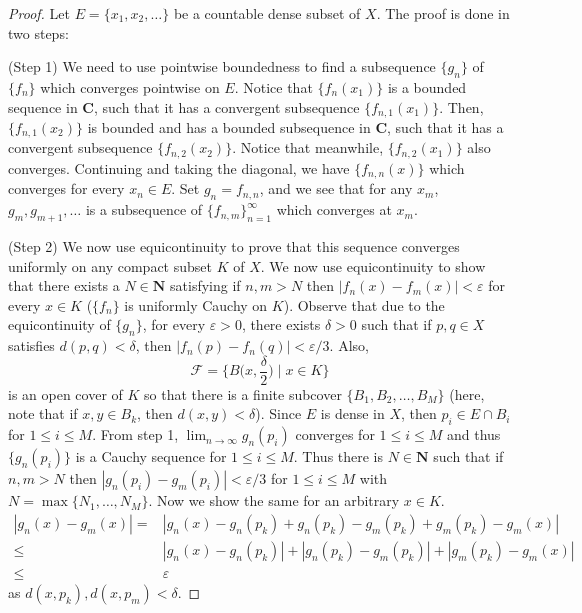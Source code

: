 \begin{proof}
Let $E=\{x_1,x_2,\ldots \}$ be a countable dense subset of $X$. The proof is done in two steps:

\bigskip

(Step 1) We need to use pointwise boundedness to find a subsequence $\{g_{n}\}$ of $\{f_{n}\}$ which converges pointwise on $E$. Notice that $\{f_{n}(x_1)\}$ is a bounded sequence in ${\bm C}$, such that it has a convergent subsequence $\{f_{n,1}(x_1)\}$. Then, $\{f_{n,1}(x_2)\}$ is bounded and has a bounded subsequence in ${\bm C}$, such that it has a convergent subsequence $\{f_{n,2}(x_2)\}$. Notice that meanwhile, $\{f_{n,2}(x_1)\}$ also converges. Continuing and taking the diagonal, we have $\{f_{n,n}(x)\}$ which converges for every $x_{n}\in E$. Set $g_{n}=f_{n,n}$, and we see that for any $x_{m}$, $g_{m},g_{m+1},\ldots $ is a subsequence of $\{f_{n,m}\}^{\infty }_{n=1}$ which converges at $x_{m}$. 

\bigskip

(Step 2) We now use equicontinuity to prove that this sequence converges uniformly on any compact subset $K$ of $X$. We now use equicontinuity to show that there exists a $N\in {\bm N}$ satisfying if $n,m>N$ then $|f_{n}(x)-f_{m}(x)|<\varepsilon $ for every $x\in K$ ($\{f_{n}\}$ is uniformly Cauchy on $K$). Observe that due to the equicontinuity of $\{g_{n}\}$, for every $\varepsilon >0$, there exists $\delta >0$ such that if $p,q\in X$ satisfies $d(p,q)<\delta $, then $|f_{n}(p)-f_{n}(q)|<\varepsilon /3$. Also, 
\[\mathcal{F}=\Big\{B\Big(x,\dfrac{\delta }{2}\Big)\;\Big|\;x\in K\Big\}\]
is an open cover of $K$ so that there is a finite subcover $\{B_1,B_2,\ldots ,B_{M}\}$ (here, note that if $x,y\in B_{k}$, then $d(x,y)<\delta $). Since $E$ is dense in $X$, then $p_{i}\in E\cap B_{i}$ for $1\leq i\leq M$. From step 1, $\lim _{n\rightarrow \infty } g_{n}(p_{i})$ converges for $1\leq i\leq M$ and thus $\{g_{n}(p_{i})\}$ is a Cauchy sequence for $1\leq i\leq M$. Thus there is $N\in {\bm N}$ such that if $n,m>N$ then $|g_{n}(p_{i})-g_{m}(p_{i})|<\varepsilon /3$ for $1\leq i\leq M$ with $N=\max\{N_1,\ldots ,N_{M}\}$. Now we show the same for an arbitrary $x\in K$.
\[\begin{align*}
|g_{n}(x)-g_{m}(x)|=&|g_{n}(x)-g_{n}(p_{k})+g_{n}(p_{k})-g_{m}(p_{k})+g_{m}(p_{k})-g_{m}(x)|\\
\leq&|g_{n}(x)-g_{n}(p_{k})|+|g_{n}(p_{k})-g_{m}(p_{k})|+|g_{m}(p_{k})-g_{m}(x)|\\
\leq&\varepsilon 
\end{align*}\]
as $d(x,p_{k}),d(x,p_{m})<\delta $.
\end{proof}
